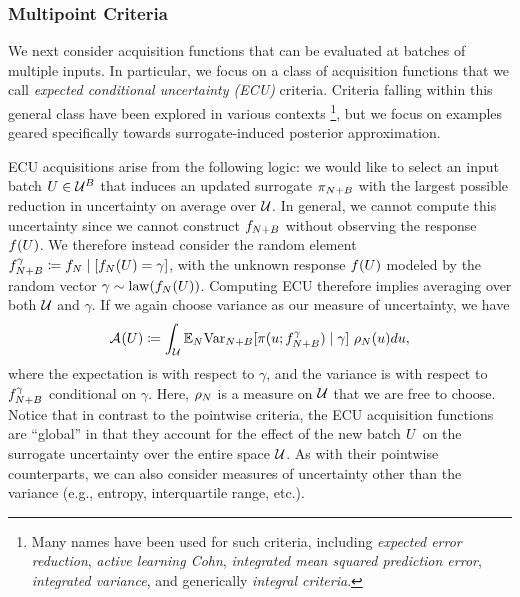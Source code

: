 \documentclass[12pt]{article}
\begin{document}
\subsubsection{Multipoint Criteria} \label{sec:acq-multipoint}
We next consider acquisition functions that can be evaluated at batches of multiple inputs. In particular,
we focus on a class of acquisition functions that we call \textit{expected conditional uncertainty (ECU)} 
criteria. Criteria falling within this general class have been explored in various contexts 
\citep{ALC,Roy2001,Mercer_kernels_IVAR,Binois_2018,deepGPAL,ALExpErrReduction,parallelSURExcursionSet}
\footnote{Many names have been used for such criteria, including \textit{expected error reduction}, 
\textit{active learning Cohn}, \textit{integrated mean squared prediction error}, \textit{integrated variance}, 
and generically \textit{integral criteria}.},
but we focus on examples geared specifically towards surrogate-induced posterior approximation.

ECU acquisitions arise from the following logic: we would like to select an input batch 
$\parMat \in \parSpace^{\Nbatch}$ that induces an updated surrogate $\postEm[\Naugment]$ with the largest 
possible reduction in uncertainty on average over $\parSpace$. In general, we cannot compute this uncertainty
since we cannot construct $\funcEm[\Naugment]$ without observing the response $\func(\parMat)$. We therefore
instead consider the random element 
$\funcEm[\Naugment]^{\gamma} \Def \funcEm[\Ndesign] \given [\funcEm[\Ndesign](\parMat) = \gamma]$, with 
the unknown response $\func(\parMat)$ modeled by the random vector 
$\gamma \sim \mathrm{law}(\funcEm[\Ndesign](\parMat))$. Computing ECU therefore implies averaging over 
both $\parSpace$ and $\gamma$. If we again choose variance as our measure of uncertainty, we have
\begin{equation}
\acq[](\parMat) \Def 
\int_{\parSpace} \E_{\Ndesign} \Var_{\Naugment}[\postDens(\Par; \funcEm[\Naugment]^{\gamma}) \given \gamma] \ \weightDens(\Par) d\Par,
 \label{eq:acq-intvar}
\end{equation}
where the expectation is with respect to $\gamma$, and the variance is with respect to $\funcEm[\Naugment]^{\gamma}$
conditional on $\gamma$. Here, $\weightDens$ is a measure on $\parSpace$ that we are free to choose.
Notice that in contrast to the pointwise 
criteria, the ECU acquisition functions are ``global'' in that they account for the effect of the 
new batch $\parMat$ on the surrogate uncertainty over the entire space $\parSpace$. As with their 
pointwise counterparts, we can also consider measures of uncertainty other than the 
variance (e.g., entropy, interquartile range, etc.).
\end{document}
